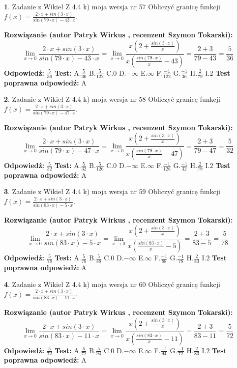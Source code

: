 \documentclass[12pt, a4paper]{article}
\theoremstyle{definition} %
\newtheorem{zad}{}
\newcommand{\zadStart}[1]{\begin{zad}#1\newline}
\newcommand{\zadStop}{\end{zad}}
\newcommand{\rozwStart}[2]{\noindent \textbf{Rozwiązanie (autor #1 , recenzent #2): }\newline}
\newcommand{\rozwStop}{\newline}
\newcommand{\odpStart}{\noindent \textbf{Odpowiedź:}\newline}
\newcommand{\odpStop}{\newline}
\newcommand{\testStart}{\noindent \textbf{Test:}\newline}
\newcommand{\testStop}{\newline}
\newcommand{\kluczStart}{\noindent \textbf{Test poprawna odpowiedź:}\newline}
\newcommand{\kluczStop}{\newline}
\begin{document}
\zadStart{Zadanie z Wikieł Z 4.4 k) moja wersja nr 57}
Obliczyć granicę funkcji $f(x)=\frac{2\cdot x +sin(3\cdot x)}{sin(79\cdot x) -43\cdot x}$.
\zadStop
\rozwStart{Patryk Wirkus}{Szymon Tokarski}
$$\lim\limits_{x\to 0}\frac{2\cdot x +sin(3\cdot x)}{sin(79\cdot x) -43\cdot x}
=\lim\limits_{x\to 0}\frac{x(2+\frac{sin(3\cdot x)}{x})}{x(\frac{sin(79\cdot x)}{x}-43)}
=\frac{2+3}{79-43} = \frac{5}{36}$$
\rozwStop
\odpStart
$\frac{5}{36}$
\odpStop
\testStart
A.$\frac{5}{36}$
B.$\frac{5}{122}$
C.$0$
D.$-\infty$
E.$\infty$
F.$\frac{-1}{122}$
G.$\frac{-1}{36}$
H.$\frac{2}{79}$
I.$2$
\testStop
\kluczStart
A
\kluczStop



\zadStart{Zadanie z Wikieł Z 4.4 k) moja wersja nr 58}
Obliczyć granicę funkcji $f(x)=\frac{2\cdot x +sin(3\cdot x)}{sin(79\cdot x) -47\cdot x}$.
\zadStop
\rozwStart{Patryk Wirkus}{Szymon Tokarski}
$$\lim\limits_{x\to 0}\frac{2\cdot x +sin(3\cdot x)}{sin(79\cdot x) -47\cdot x}
=\lim\limits_{x\to 0}\frac{x(2+\frac{sin(3\cdot x)}{x})}{x(\frac{sin(79\cdot x)}{x}-47)}
=\frac{2+3}{79-47} = \frac{5}{32}$$
\rozwStop
\odpStart
$\frac{5}{32}$
\odpStop
\testStart
A.$\frac{5}{32}$
B.$\frac{5}{126}$
C.$0$
D.$-\infty$
E.$\infty$
F.$\frac{-1}{126}$
G.$\frac{-1}{32}$
H.$\frac{2}{79}$
I.$2$
\testStop
\kluczStart
A
\kluczStop



\zadStart{Zadanie z Wikieł Z 4.4 k) moja wersja nr 59}
Obliczyć granicę funkcji $f(x)=\frac{2\cdot x +sin(3\cdot x)}{sin(83\cdot x) -5\cdot x}$.
\zadStop
\rozwStart{Patryk Wirkus}{Szymon Tokarski}
$$\lim\limits_{x\to 0}\frac{2\cdot x +sin(3\cdot x)}{sin(83\cdot x) -5\cdot x}
=\lim\limits_{x\to 0}\frac{x(2+\frac{sin(3\cdot x)}{x})}{x(\frac{sin(83\cdot x)}{x}-5)}
=\frac{2+3}{83-5} = \frac{5}{78}$$
\rozwStop
\odpStart
$\frac{5}{78}$
\odpStop
\testStart
A.$\frac{5}{78}$
B.$\frac{5}{88}$
C.$0$
D.$-\infty$
E.$\infty$
F.$\frac{-1}{88}$
G.$\frac{-1}{78}$
H.$\frac{2}{83}$
I.$2$
\testStop
\kluczStart
A
\kluczStop



\zadStart{Zadanie z Wikieł Z 4.4 k) moja wersja nr 60}
Obliczyć granicę funkcji $f(x)=\frac{2\cdot x +sin(3\cdot x)}{sin(83\cdot x) -11\cdot x}$.
\zadStop
\rozwStart{Patryk Wirkus}{Szymon Tokarski}
$$\lim\limits_{x\to 0}\frac{2\cdot x +sin(3\cdot x)}{sin(83\cdot x) -11\cdot x}
=\lim\limits_{x\to 0}\frac{x(2+\frac{sin(3\cdot x)}{x})}{x(\frac{sin(83\cdot x)}{x}-11)}
=\frac{2+3}{83-11} = \frac{5}{72}$$
\rozwStop
\odpStart
$\frac{5}{72}$
\odpStop
\testStart
A.$\frac{5}{72}$
B.$\frac{5}{94}$
C.$0$
D.$-\infty$
E.$\infty$
F.$\frac{-1}{94}$
G.$\frac{-1}{72}$
H.$\frac{2}{83}$
I.$2$
\testStop
\kluczStart
A
\kluczStop
\end{document}
